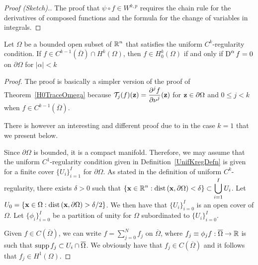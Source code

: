 \begin{proof}[Proof (Sketch).]
The proof that $\displaystyle \psi \circ f \in W^{k,p}$ requires the
chain rule for the derivatives of composed functions and the formula
for the change of variables in integrals.
\end{proof}

\begin{prop} \label{sob_w0_trad2}
Let $\Omega$ be a bounded open subset of
$\displaystyle \mathbb{R}^n$ that satisfies the uniform
$\displaystyle C^k$-regularity condition.  If
$\displaystyle f \in C^{k-1}\left(\overline{\Omega}\right) \cap H^k(\Omega)$,
then
$\displaystyle f \in H^k_0(\Omega)$ if and only if
$\displaystyle \operatorname{D}^\alpha f =0$ on $\partial \Omega$ for $|\alpha|<k$
\end{prop}

\begin{proof}
The proof is basically a simpler version of the proof
of Theorem~\ref{H0TraceOmega} because
$\displaystyle \mathcal{T}_j(f)(\mathbf{z}) = \frac{\displaystyle \partial^{j}{f}} {\displaystyle \partial \nu^{j}}(\mathbf{z})$ for
$\mathbf{z} \in \partial \Omega$ and $0 \leq j < k$ when
$\displaystyle f \in C^{k-1}\left(\overline{\Omega}\right)$.

There is however an interesting and different proof due to \cite{Br}
in the case $k=1$ that we present below.

Since $\partial \Omega$ is bounded, it is a compact manifold.
Therefore, we may assume that the uniform $C^1$-regularity condition
given in Definition~\ref{UnifKregDefn} is
given for a finite cover
$\displaystyle \{ U_i \}_{i=1}^I$ for $\partial \Omega$.
As stated in the definition of uniform $\displaystyle C^k$-regularity,
there exists $\delta>0$ such that
$\displaystyle \left\{ \mathbf{x} \in \mathbb{R}^n :
\mathrm{dist}\left(\mathbf{x},\partial \Omega\right)  < \delta \right\} \subset
\bigcup_{i=1}^I U_i$.
Let $\displaystyle U_0 = \left\{ \mathbf{x} \in \Omega :
\mathrm{dist}\left(\mathbf{x},\partial \Omega\right)  > \delta/2 \right\}$.
We then have that $\displaystyle \{ U_i \}_{i=0}^I$ is an open cover of
$\Omega$.
Let $\displaystyle \{ \phi_i \}_{i=0}^I$ be a partition of unity for
$\Omega$ subordinated to $\displaystyle \{ U_i \}_{i=0}^I$.

Given $\displaystyle f \in C(\overline{\Omega})$, we can write 
$\displaystyle f = \sum_{j=0}^N f_j$ on $\overline{\Omega}$,
where $f_j \equiv \phi_j f :\overline{\Omega} \rightarrow \mathbb{R}$ is such that
$\operatorname{supp} f_j \subset U_i \cap \overline{\Omega}$.
We obviously have that $\displaystyle f_j \in C\left(\overline{\Omega}\right)$
and it follows that $\displaystyle f_j \in H^1(\Omega)$.


\end{proof}
